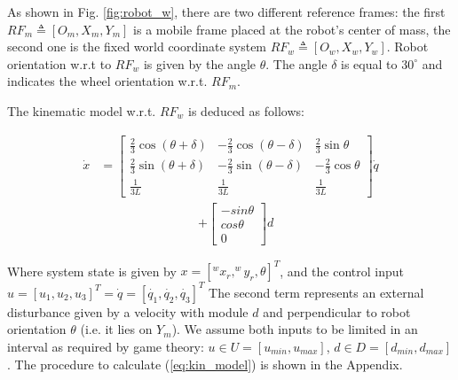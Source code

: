 As shown in Fig. \ref{fig:robot_w}, there are two different reference frames: the first $RF_m \triangleq [O_m, X_m, Y_m]$ is a mobile frame placed at the robot's center of mass, the second one is the fixed world coordinate system $RF_w \triangleq [O_w, X_w, Y_w]$. Robot orientation w.r.t to $RF_w$ is given by the angle $\theta$. The angle $\delta$ is equal to $30^\circ$ and indicates the wheel orientation w.r.t. $RF_m$.

The kinematic model w.r.t. $RF_w$ is deduced as follows:

\begin{align}
    \dot{x} &= \begin{bmatrix}
           \frac{2}{3}\cos{(\theta + \delta)} & -\frac{2}{3}\cos{(\theta - \delta)} &  \frac{2}{3}\sin{\theta}   \\
           \frac{2}{3}\sin{(\theta + \delta)} & -\frac{2}{3}\sin{(\theta - \delta)} &  -\frac{2}{3}\cos{\theta} \\
           \frac{1}{3L} & \frac{1}{3L} & \frac{1}{3L}
         \end{bmatrix} \dot{q} 
  \label{eq:kin_model}
\end{align}
\begin{align*}
    &+ \begin{bmatrix}
         -sin{\theta} \\
         cos{\theta} \\
         0
        \end{bmatrix} d
\end{align*}

Where system state is given by $x = [^w x_r, ^w y_r, \theta]^T$, and the control input $u=[u_1, u_2, u_3]^T = \dot{q} = [\dot{q_1}, \dot{q_2}, \dot{q_3}]^T$ The second term represents an external disturbance given by a velocity with module $d$ and perpendicular to robot orientation $\theta$ (i.e. it lies on $Y_m$). We assume both inputs to be limited in an interval as required by game theory: $u \in U = [u_{min}, u_{max}]$, $d \in D = [d_{min}, d_{max}]$.
The procedure to calculate (\ref{eq:kin_model}) is shown in the Appendix.

